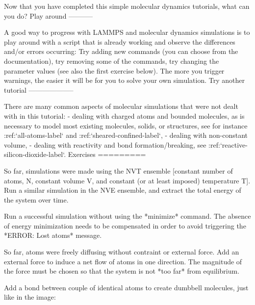 Now that you have completed this simple molecular dynamics tutorials, what can you do?
Play around
-----------

A good way to progress with LAMMPS and molecular dynamics
simulations is to play around with a script that is already
working and observe the differences and/or errors occurring:
Try adding new commands (you can choose from the documentation),
try removing some of the commands, try changing the parameter values
(see also the first exercise below).
The more you trigger warnings, the easier it will be for you to solve your
own simulation.
Try another tutorial
--------------------

There are many common aspects of molecular simulations that were not dealt with in this
tutorial:
- dealing with charged atoms and bounded molecules, as is necessary to model most existing molecules, solids, or structures, see for instance :ref:`all-atoms-label` and :ref:`sheared-confined-label`,
- dealing with non-constant volume,
- dealing with reactivity and bond formation/breaking, see :ref:`reactive-silicon-dioxide-label`.
Exercises
=========

So far, simulations were made using the NVT ensemble [constant number 
of atoms, N, constant volume V, and constant (or at least imposed)
temperature T].
Run a similar simulation in the NVE ensemble, and extract the
total energy of the system over time.

Run a successful simulation without using the *minimize* command.
The absence of energy minimization needs to be compensated
in order to avoid triggering the *ERROR: Lost atoms* message.

So far, atoms were freely diffusing without contraint or external force.
Add an external force to induce a net flow of atoms in one
direction. The magnitude of the force must be chosen so
that the system is not *too far* from equilibrium.

Add a bond between couple of identical atoms to create
dumbbell molecules, just like in the image:


